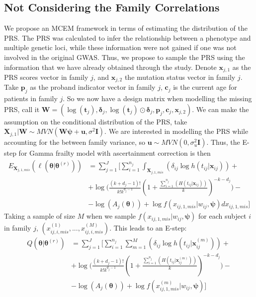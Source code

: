 \documentclass[preprint,12pt]{elsarticle}
\begin{document}
\subsection{Not Considering the Family Correlations}
We propose an MCEM framework in terms of estimating the distribution of the PRS. 
The PRS was calculated to infer the relationship between a phenotype and multiple genetic loci, while these information were not gained if one was not involved in the original GWAS. 
Thus, we propose to sample the PRS using the information that we have already obtained through the study. Denote $\mathbf{x}_{j,1}$ as the PRS scores vector in family $j$, and $\mathbf{x}_{j,2}$ the mutation status vector in family $j$. 
Take $\mathbf{p}_j$ as the proband indicator vector in family $j$, $\mathbf{c}_j$ is the current age for patients in family $j$. 
So we now have a design matrix when modelling the missing PRS, call it $\mathbf{W}=(\log(\mathbf{t}_j), \boldsymbol{\delta}_j, \log(\mathbf{t}_j)\odot \boldsymbol{\delta}_j, \mathbf{p}_j, \mathbf{c}_j, \mathbf{x}_{j,2})$.
We can make the assumption on the conditional distribution of the PRS, take $\mathbf{X}_{j,1}|\mathbf{W} \sim MVN (\mathbf{W}\boldsymbol{\psi}+\mathbf{u},\sigma^2\mathbf{I})$. 
We are interested in modelling the PRS while accounting for the between family variance, so $\mathbf{u}\sim MVN(0, \sigma_u^2\mathbf{I})$. Thus, the E-step for Gamma frailty model with ascertainment correction is then
\begin{align}
    E_{\mathbf{X}_{j,1,mis}}(\ell(\boldsymbol{\theta}|\boldsymbol{\theta}^{(r)}))&=\sum_{j=1}^J\Bigg [\sum_{i=1}^{n_j}\int_{\boldsymbol{X}_{j,1,mis}}(\delta_{ij}\log h(t_{ij}|\mathbf{x}_{ij}))+ \\ 
    & + \log\Big (\frac{(k+d_j-1)!}{k!k^{d_j-1}}(1+\frac{\sum_{i=1}^{n_j}(H(t_{ij}|\mathbf{x}_{ij}))}{k})^{-k-d_j}\Big ) - \\
    & - \log(A_j(\boldsymbol{\theta})) + \log f(x_{ij,1,mis}|w_{ij},\boldsymbol{\psi}) dx_{ij,1,mis}\Bigg ]
\end{align}
Taking a sample of size $M$ when we sample $f(x_{ij,1,mis}|w_{ij}, \boldsymbol{\psi})$ for each subject $i$ in family $j$, $(x_{ij,i,mis}^{(1)}, ..., x_{ij,i,mis}^{(M)})$. 
This leads to an E-step:
\begin{align} 
    Q(\boldsymbol{\theta}|\boldsymbol{\theta}^{(r)})&=\sum_{j=1}^J\Bigg [\sum_{i=1}^{n_j}\sum_{m=1}^M(\delta_{ij}\log h(t_{ij}|\mathbf{x}_{ij}^{(m)}))+ \\ 
    & + \log\Big (\frac{(k+d_j-1)!}{k!k^{d_j-1}}(1+\frac{\sum_{i=1}^{n_j}(H(t_{ij}|\mathbf{x}_{ij}^{(m)}))}{k})^{-k-d_j}\Big ) - \\
    & - \log(A_j(\boldsymbol{\theta})) + \log f(x_{ij,1,mis}^{(m)}|w_{ij},\boldsymbol{\psi}) \Bigg ]
\end{align}
\end{document}
